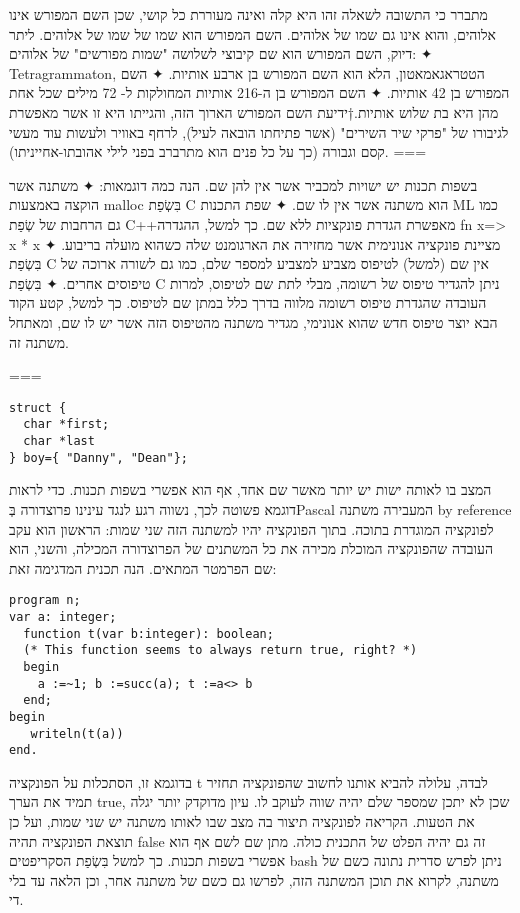 מתברר כי התשובה לשאלה זהו היא קלה ואינה מעוררת כל קושי, שכן השם המפורש אינו אלוהים, והוא אינו גם שמו של אלוהים. השם המפורש הוא שמו של שמו של אלוהים. ליתר דיוק, השם המפורש הוא שם קיבוצי לשלושה "שמות מפורשים" של אלוהים:
✦ Tetragrammaton, הטטראגאמאטון, הלא הוא השם המפורש בן ארבע אותיות.
✦ השם המפורש בן 42 אותיות.
✦ השם המפורש בן ה-216 אותיות המחולקות ל- 72 מילים שכל אחת מהן היא בת שלוש אותיות.†{ידיעת השם המפורש הארוך הזה, והגייתו היא זו אשר מאפשרת לגיבורו של "פרקי שיר השירים" (אשר פתיחתו הובאה לעיל), לרחף באוויר ולעשות עוד מעשי קסם וגבורה (כך על כל פנים הוא מתרברב בפני לילי אהובתו-אחייניתו).}
===

בשפות תכנות יש ישויות למכביר אשר אין להן שם. הנה כמה דוגמאות:
✦ משתנה אשר הוקצה באמצעות malloc בִּשְׂפַת C הוא משתנה אשר אין לו שם.
     ✦ שפת התכנות ML כמו גם הרחבות של שְׂפַת C++מאפשרת הגדרת פונקציות ללא שם.
      כך למשל, ההגדרה
      fn x=> x * x
      מציינת פונקציה אנונימית אשר מחזירה את הארגומנט שלה כשהוא מועלה בריבוע.
     ✦ בִּשְׂפַת C אין שם (למשל) לטיפוס מצביע למצביע למספר שלם, כמו גם לשורה ארוכה של טיפוסים אחרים.
     ✦ בִּשְׂפַת C ניתן להגדיר טיפוס של רשומה, מבלי לתת שם לטיפוס, למרות העובדה שהגדרת טיפוס רשומה מלווה בדרך כלל במתן שם לטיפוס.
      כך למשל, קטע הקוד הבא יוצר טיפוס חדש שהוא אנונימי, מגדיר משתנה מהטיפוס הזה אשר יש לו שם, ומאתחל משתנה זה.

    ===
\begin{verbatim}
struct {
  char *first;
  char *last
} boy={ "Danny", "Dean"};
\end{verbatim}

המצב בו לאותה ישות יש יותר מאשר שם אחד, אף הוא אפשרי בשפות תכנות. כדי לראות
דוגמא פשוטה לכך, נשווה רגע לנגד עינינו פרוצדורה בְּPascal המעבירה משתנה by
reference לפונקציה המוגדרת בתוכה. בתוך הפונקציה יהיו למשתנה הזה שני שמות:
הראשון הוא עקב העובדה שהפונקציה המוכלת מכירה את כל המשתנים של הפרוצדורה המכילה,
והשני, הוא שם הפרמטר המתאים. הנה תכנית המדגימה זאת:

\begin{verbatim}
program n;
var a: integer;
  function t(var b:integer): boolean;
  (* This function seems to always return true, right? *)
  begin
    a :=~1; b :=succ(a); t :=a<> b
  end;
begin
   writeln(t(a))
end.
\end{verbatim}

בדוגמא זו, הסתכלות על הפונקציה t לבדה, עלולה להביא אותנו לחשוב שהפונקציה תחזיר
תמיד את הערך true, שכן לא יתכן שמספר שלם יהיה שווה לעוקב לו. עיון מדוקדק יותר
יגלה את הטעות. הקריאה לפונקציה תיצור בה מצב שבו לאותו משתנה יש שני שמות, ועל
כן תוצאת הפונקציה תהיה false זה גם יהיה הפלט של התכנית כולה. מתן שם לשם אף
הוא אפשרי בשפות תכנות. כך למשל בִּשְׂפַת הסקריפטים bash ניתן לפרש סדרית נתונה כשם
של משתנה, לקרוא את תוכן המשתנה הזה, לפרשו גם כשם של משתנה אחר, וכן הלאה עד בלי
די.


